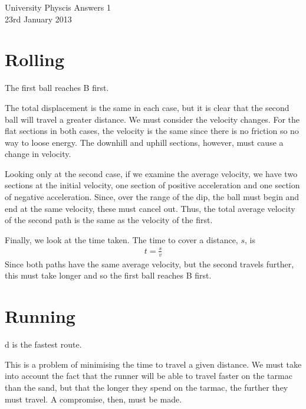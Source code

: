 
\makeatletter
\renewcommand{\@maketitle}{
\newpage
 \null
 \vskip 2em%
 \begin{center}%
  {\Large \@title \par}%
 \end{center}%
 \par} \makeatother

\begin{center}
\Huge University Physcis Answers 1\\[1em]
\large 23rd January 2013
\end{center}
\setcounter{section}{0}

\section{Rolling}
The first ball reaches B first.

The total displacement is the same in each case, but it is clear that the second ball will travel a greater distance. We must consider the velocity changes. For the flat sections in both cases, the velocity is the same since there is no friction so no way to loose energy. The downhill and uphill sections, however, must cause a change in velocity. 

Looking only at the second case, if we examine the average velocity, we have two sections at the initial velocity, one section of positive acceleration and one section of negative acceleration. Since, over the range of the dip, the ball must begin and end at the same velocity, these must cancel out. Thus, the total average velocity of the second path is the same as the velocity of the first.

Finally, we look at the time taken. The time to cover a distance, $s$, is
\begin{align*}
	t = \frac{s}{v}
\end{align*}
Since both paths have the same average velocity, but the second travels further, this must take longer and so the first ball reaches B first.

\section{Running}
d is the fastest route.

This is a problem of minimising the time to travel a given distance. We must take into account the fact that the runner will be able to travel faster on the tarmac than the sand, but that the longer they spend on the tarmac, the further they must travel. A compromise, then, must be made.

